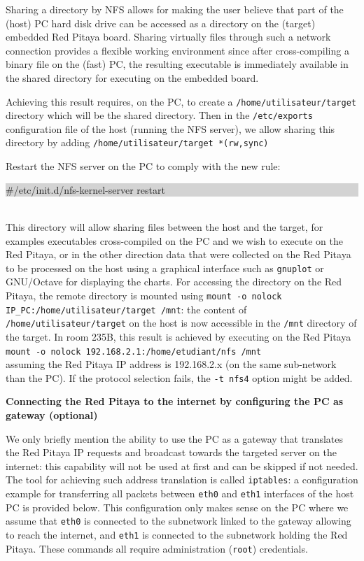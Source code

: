 \documentclass{article}
\begin{document}
{Sharing a directory by NFS allows for making the user believe that part of the (host) PC hard
disk drive can be accessed as a directory on the (target) embedded Red Pitaya board. Sharing
virtually files through such a network connection provides a flexible working environment since
after cross-compiling a binary file on the (fast) PC, the resulting executable is immediately
available in the shared directory for executing on the embedded board.

Achieving this result requires, on the PC, to create a {\tt /home/utilisateur/target} 
directory which will be the shared directory. Then in the {\tt /etc/exports} configuration
file of the host (running the NFS server), we allow sharing this directory by adding
{\tt /home/utilisateur/target *(rw,sync)}

Restart the NFS server on the PC to comply with the new rule:\\
\colorbox{lightgray}{\begin{minipage}{0.9\textwidth}
\#/etc/init.d/nfs-kernel-server restart
\end{minipage}}\\

This directory will allow sharing files between the host and the target, for examples
executables cross-compiled on the PC and we wish to execute on the Red Pitaya, or in the
other direction data that were collected on the Red Pitaya to be processed on the host
using a graphical interface such as {\tt gnuplot} or GNU/Octave for displaying the charts.
For accessing the directory on the Red Pitaya, the remote directory is mounted using
{\tt mount -o nolock IP\_PC:/home/utilisateur/target /mnt}: the content of {\tt 
/home/utilisateur/target} on the host is now accessible in the {\tt /mnt} directory of the 
target. In room 235B, this result is achieved by executing on the Red Pitaya\\
{\tt mount -o nolock 192.168.2.1:/home/etudiant/nfs /mnt} \\
assuming the Red Pitaya IP address is 192.168.2.x (on the same sub-network than the PC). If the protocol
selection fails, the {\tt -t nfs4} option might be added.

\textbf{Connecting the Red Pitaya to the internet by configuring the PC as gateway (optional)}

We only briefly mention the ability to use the PC as a gateway that translates the
Red Pitaya IP requests and broadcast towards the targeted server on the internet: this
capability will not be used at first and can be skipped if not needed. The tool for
achieving such address translation is called {\tt iptables}: a configuration example
for transferring all packets between {\tt eth0} and {\tt eth1} interfaces of the host PC is
provided below. {\color{red}This configuration only makes sense on the PC where we assume
that {\tt eth0} is connected to the subnetwork linked to the gateway allowing to reach the
internet, and {\tt eth1} is connected to the subnetwork holding the Red Pitaya. These commands
all require administration ({\tt root}) credentials.}

}
\end{document}
